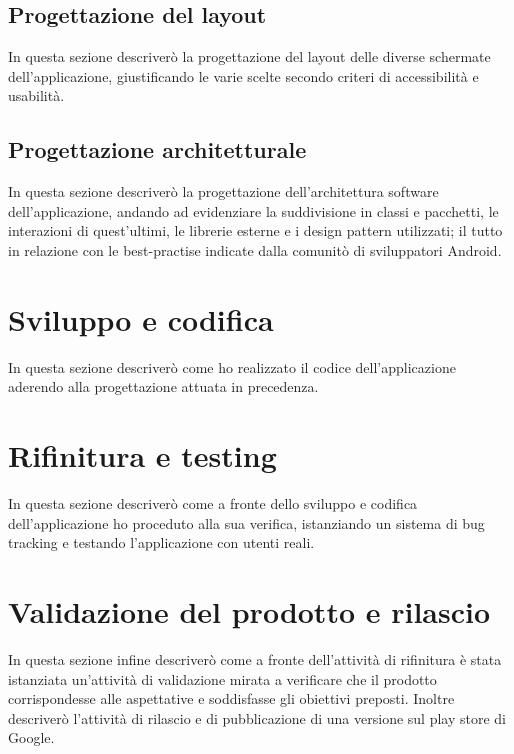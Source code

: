 \subsection{Progettazione del layout}

In questa sezione descriverò la progettazione del layout delle diverse schermate dell'applicazione, giustificando le varie scelte secondo criteri di accessibilità e usabilità.

\subsection{Progettazione architetturale}

In questa sezione descriverò la progettazione dell'architettura software dell'applicazione, andando ad evidenziare la suddivisione in classi e pacchetti, le interazioni di quest'ultimi, le librerie esterne e i design pattern utilizzati; il tutto in relazione con le best-practise indicate dalla comunitò di sviluppatori Android.

\section{Sviluppo e codifica}

In questa sezione descriverò come ho realizzato il codice dell'applicazione aderendo alla progettazione attuata in precedenza.

\section{Rifinitura e testing}

In questa sezione descriverò come a fronte dello sviluppo e codifica dell'applicazione ho proceduto alla sua verifica, istanziando un sistema di bug tracking e testando l'applicazione con utenti reali.

\section{Validazione del prodotto e rilascio}

In questa sezione infine descriverò come a fronte dell'attività di rifinitura è stata istanziata un'attività di validazione mirata a verificare che il prodotto corrispondesse alle aspettative e soddisfasse gli obiettivi preposti. Inoltre descriverò l'attività di rilascio e di pubblicazione di una versione sul play store di Google.
